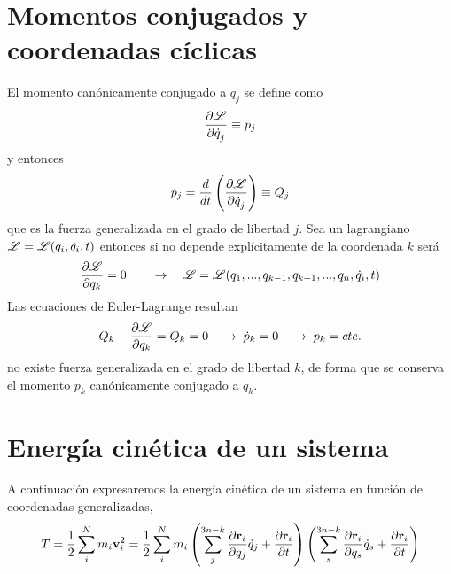 \documentclass[10pt,oneside]{CBFT_article}
\begin{document}
\section{Momentos conjugados y coordenadas cíclicas}

El momento canónicamente conjugado a $q_j$ se define como 
\[
\frac{\partial^{\hspace{-0.05em}} {\mathscr{L}}}{\partial {\dot{q}_j}^{\hspace{-0.05em}}} \equiv p_j
\]
y entonces 
\[
\dot{p}_j = \frac{d}{dt}\left( \frac{\partial^{\hspace{-0.05em}} {\mathscr{L}}}{\partial {\dot{q}_j}^{\hspace{-0.05em}}} \right) \equiv Q_j
\]
que es la fuerza generalizada en el grado de libertad $j$.
Sea un lagrangiano $\mathscr{L} = \mathscr{L}( q_i,\dot{q}_i, t )$ entonces si no depende explícitamente
de la coordenada $k$ será
\[
\frac{\partial^{\hspace{-0.05em}} {\mathscr{L}}}{\partial {q_k}^{\hspace{-0.05em}}}= 0 \qquad \rightarrow \quad \mathscr{L} = \mathscr{L}( q_1,...,q_{k-1},q_{k+1},...,q_n,\dot{q}_i, t )
\]
Las ecuaciones de Euler-Lagrange resultan 
\[
Q_k - \frac{\partial^{\hspace{-0.05em}} {\mathscr{L}}}{\partial {q_k}^{\hspace{-0.05em}}} = Q_k = 0 \quad \rightarrow \;\dot{p}_k = 0 \quad \rightarrow \; p_k = cte.
\]
no existe fuerza generalizada en el grado de libertad $k$, de forma que se conserva el momento
$p_k$ canónicamente conjugado a $q_k$.

\section{Energía cinética de un sistema}

A continuación expresaremos la energía cinética de un sistema en función de coordenadas generalizadas,
\[
T = \frac{1}{2} \sum_i^N m_i \vb{v}_i^2 =
\frac{1}{2} \sum_i^N m_i \left( \sum_j^{3n-k}  \dpar{\vb{r}_i}{q_j}\dot{q}_j + \dpar{\vb{r}_i}{t} \right)
\left( \sum_s^{3n-k} \dpar{\vb{r}_i}{q_s}\dot{q}_s + \dpar{\vb{r}_i}{t} \right) 
\]



\end{document}
